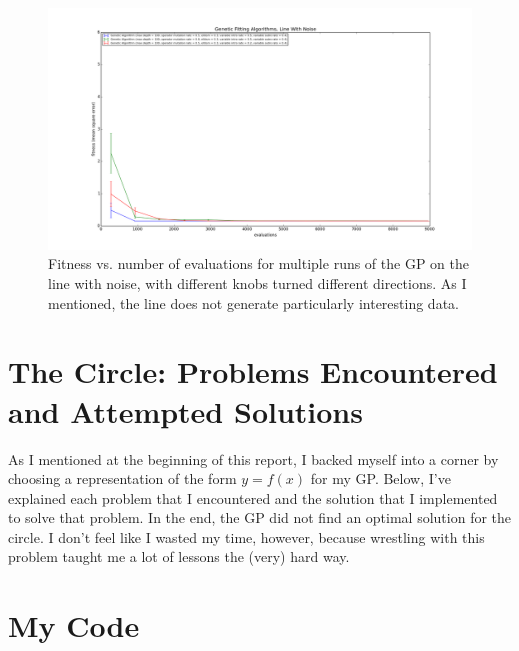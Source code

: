 \documentclass[11pt,amsmath,amssymb]{revtex4}
\begin{document}
\begin{figure}[H]
\center
\includegraphics[scale=0.4]{Line_With_Noise_Comparison.png}
\caption{Fitness vs. number of evaluations for multiple runs of the GP on the line with noise, with different knobs turned different directions. As I mentioned, the line does not generate particularly interesting data.}
\label{q1}
\end{figure}


\section{The Circle: Problems Encountered and Attempted Solutions}
As I mentioned at the beginning of this report, I backed myself into a corner by choosing a representation of the form $y=f(x)$ for my GP. Below, I've explained each problem that I encountered and the solution that I implemented to solve that problem. In the end, the GP did not find an optimal solution for the circle. I don't feel like I wasted my time, however, because wrestling with this problem taught me a lot of lessons the (very) hard way.



\newpage\newpage
\section{My Code}
\begin{lstlisting}

\end{lstlisting}
\end{document}
